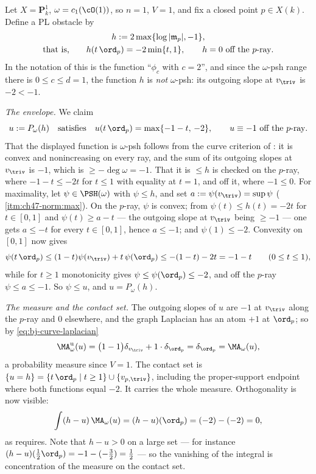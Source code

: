 \begin{example}
\label{ex:ch47-orthogonality-p1}
Let $X=\mathbf P^1_k$, $\omega=c_1(\cO(1))$, so $n=1$, $V=1$, and
fix a closed point $p\in X(k)$.  Define a PL obstacle by
\[
 \begin{gathered}
 h:=2\max\{\log|\mathfrak m_p|,-1\},\\
 \text{that is,}\qquad
 h(t\,\ord_p)=-2\min\{t,1\},
 \qquad h=0\ \text{off the }p\text{-ray}.
 \end{gathered}
\]
In the notation of  this is the function
``$\phi_c$ with $c=2$'', and since the $\omega$-psh range there is
$0\le c\le d=1$, the function $h$ is \emph{not} $\omega$-psh: its
outgoing slope at $v_{\triv}$ is $-2<-1$.

\emph{The envelope.}  We claim
\[
 u:=P_\omega(h)
 \quad\text{satisfies}\quad
 u(t\,\ord_p)=\max\{-1-t,\,-2\},\qquad u\equiv-1\ \text{off the }p\text{-ray}.
\]
That the displayed function is $\omega$-psh follows from the curve
criterion of : it is convex and nonincreasing on
every ray, and the sum of its outgoing slopes at $v_{\triv}$ is $-1$,
which is $\ge-\deg\omega=-1$.  That it is $\le h$ is checked on the
$p$-ray, where $-1-t\le-2t$ for $t\le1$ with equality at $t=1$, and
off it, where $-1\le0$.  For maximality, let $\psi\in\PSH(\omega)$ with
$\psi\le h$, and set $a:=\psi(v_{\triv})=\sup\psi$
(\,\cref{itm:ch47-norm:max}).  On the
$p$-ray, $\psi$ is convex; from $\psi(t)\le h(t)=-2t$ for
$t\in[0,1]$ and $\psi(t)\ge a-t$ --- the outgoing slope at
$v_{\triv}$ being $\ge-1$ --- one gets $a\le-t$ for every
$t\in[0,1]$, hence $a\le-1$; and $\psi(1)\le-2$.  Convexity on
$[0,1]$ now gives
\[
 \psi(t\,\ord_p)\le(1-t)\psi(v_{\triv})+t\,\psi(\ord_p)
 \le-(1-t)-2t=-1-t
 \qquad(0\le t\le1),
\]
while for $t\ge1$ monotonicity gives $\psi\le\psi(\ord_p)\le-2$, and
off the $p$-ray $\psi\le a\le-1$.  So $\psi\le u$, and
$u=P_\omega(h)$.

\emph{The measure and the contact set.}  The outgoing slopes of $u$ are
$-1$ at $v_{\triv}$ along the $p$-ray and $0$ elsewhere, and the
graph Laplacian has an atom $+1$ at $\ord_p$; so by
\eqref{eq:bj-curve-laplacian}
\[
 \MA^{\mathrm u}_\omega(u)=\bigl(1-1\bigr)\delta_{v_{\triv}}
 +1\cdot\delta_{\ord_p}=\delta_{\ord_p}
 =\MA_\omega(u),
\]
a probability measure since $V=1$.  The contact set is
$\{u=h\}=\{t\,\ord_p\mid t\ge1\}\cup\{v_{p,\triv}\}$,
including the proper-support endpoint where both functions equal $-2$.
It carries the whole measure.
Orthogonality is now visible:
\[
 \int(h-u)\,\MA_\omega(u)=(h-u)(\ord_p)=(-2)-(-2)=0 ,
\]
as  requires.  Note that
$h-u>0$ on a large set --- for instance $(h-u)(\tfrac12\ord_p)
=-1-(-\tfrac32)=\tfrac12$ --- so the vanishing of the integral is concentration of the measure on the contact set.


\end{example}
